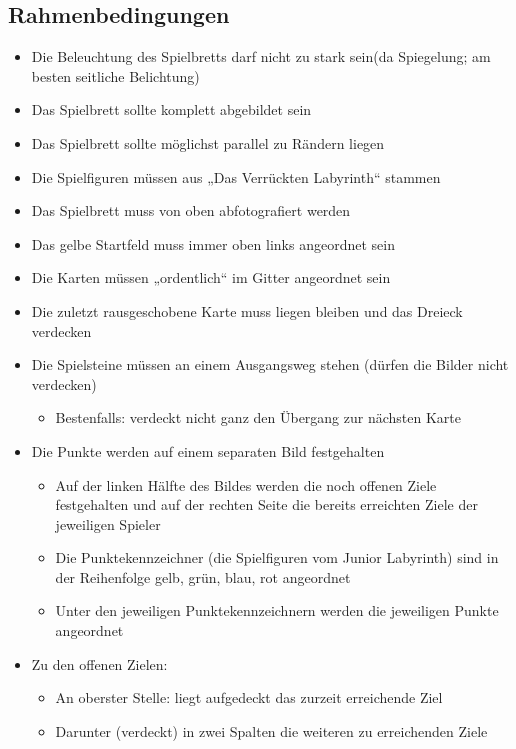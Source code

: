 \documentclass{article}
\begin{document}
\subsection{Rahmenbedingungen}
\begin{itemize}
\item Die Beleuchtung des Spielbretts darf nicht zu stark sein(da Spiegelung; am besten seitliche Belichtung)
\item Das Spielbrett sollte komplett abgebildet sein
\item Das Spielbrett sollte möglichst parallel zu Rändern liegen
\item Die Spielfiguren müssen aus „Das Verrückten Labyrinth“ stammen
\item Das Spielbrett muss von oben abfotografiert werden
\item Das gelbe Startfeld muss immer oben links angeordnet sein
\item Die Karten müssen „ordentlich“ im Gitter angeordnet sein
\item Die zuletzt rausgeschobene Karte muss liegen bleiben und das Dreieck verdecken
\item Die Spielsteine müssen an einem Ausgangsweg stehen (dürfen die Bilder nicht verdecken)
	\begin{itemize}
	\item Bestenfalls: verdeckt nicht ganz den Übergang zur nächsten Karte
	\end{itemize}

\item Die Punkte werden auf einem separaten Bild festgehalten
	\begin{itemize}
	\item Auf der linken Hälfte des Bildes werden die noch offenen Ziele festgehalten und auf der rechten Seite die bereits erreichten Ziele der jeweiligen Spieler
	\item Die Punktekennzeichner (die Spielfiguren vom Junior Labyrinth) sind in der Reihenfolge gelb, grün, blau, rot angeordnet
	\item Unter den jeweiligen Punktekennzeichnern werden die jeweiligen Punkte angeordnet
	\end{itemize}
\item Zu den offenen Zielen:
	\begin{itemize}
	\item An oberster Stelle:  liegt aufgedeckt das zurzeit 	erreichende Ziel
	\item Darunter (verdeckt) in zwei Spalten die weiteren zu erreichenden Ziele
	\end{itemize}
	\end{itemize}
\end{document}

